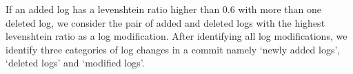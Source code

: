 If an added log has a levenshtein ratio higher than 0.6 with more than one deleted log, we consider the pair of added and deleted logs with the highest levenshtein ratio as a log modification. After identifying all log modifications, we identify three categories of log changes in a commit namely `newly added logs', `deleted logs' and `modified logs'.

